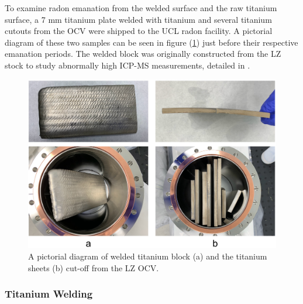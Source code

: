 To examine radon emanation from the welded surface and the raw titanium surface, a 7 mm titanium plate welded with titanium and several titanium cutouts from the OCV were shipped to the UCL radon facility. A pictorial diagram of these two samples can be seen in figure (\ref{fig:titanium_welding_sheets}) just before their respective emanation periods. The welded block was originally constructed from the LZ stock to study abnormally high ICP-MS measurements, detailed in \cite{lz_screening}.
%
\begin{figure}[t]
    \centering
    \includegraphics[scale=0.2]{Chapter_4/Figures/ucl_measurements/titanium_and_welding.jpg}
    \caption[A pictorial diagram of welded titanium block (a) and the titanium sheets (b) cut-off from the LZ OCV.]
    {A pictorial diagram of welded titanium block (a) and the titanium sheets (b) cut-off from the LZ OCV.}
    \label{fig:titanium_welding_sheets}
\end{figure}
%


\subsubsection{Titanium Welding}

